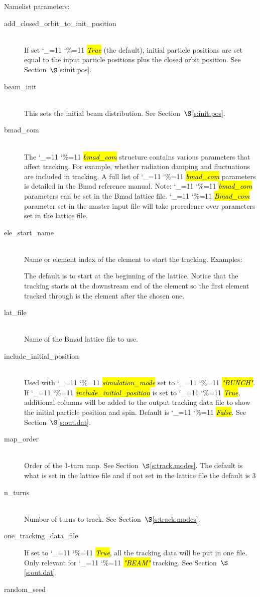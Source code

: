 \documentclass{hitec}
\newcommand\dottcmd[1]{\hl{\em#1}\endgroup}
\newcommand{\vn}{\begingroup\catcode`\_=11 \catcode`\%=11 \dottcmd}
\newcommand{\Newline}{\hfil \\}
\newcommand{\sref}[1]{$\S$\ref{#1}}
\begin{document}
{{Namelist parameters:
\begin{description}
\item[add_closed_orbit_to_init_position] \Newline
If set \vn{True} (the default), initial particle positions are set equal to the input particle positions
plus the closed orbit position. See Section~\sref{s:init.pos}.
%
\item[beam_init] \Newline
This sets the initial beam distribution. See Section~\sref{s:init.pos}.
%
\item[bmad_com] \Newline
The \vn{bmad_com} structure contains various parameters that affect tracking. For example, whether
radiation damping and fluctuations are included in tracking. A full list of \vn{bmad_com} parameters
is detailed in the Bmad reference manual. Note: \vn{bmad_com} parameters can be set in the Bmad
lattice file. \vn{Bmad_com} parameter set in the master input file will take precedence over
parameters set in the lattice file.
%
\item[ele_start_name] \Newline
Name or element index of the element to start the tracking. Examples:
The default is to start at the beginning of the lattice. Notice that the tracking starts at the downstream
end of the element so the first element tracked through is the element after the chosen one.
%
\item[lat_file] \Newline
Name of the Bmad lattice file to use.
%
\item[include_initial_position] \Newline
Used with \vn{simulation_mode} set to \vn{"BUNCH"}. If \vn{include_initial_position} is set to \vn{True},
additional columns will be added to the output tracking data file to show the initial particle
position and spin. Default is \vn{False}. See Section~\sref{s:out.dat}.
%
\item[map_order] \Newline
Order of the 1-turn map. See Section~\sref{s:track.modes}. The default is what is set in the lattice file
and if not set in the lattice file the default is 3
%
\item[n_turns] \Newline
Number of turns to track. See Section~\sref{s:track.modes}.
%
\item[one_tracking_data_file]
If set to \vn{True}, all the tracking data will be put in one file. Only relevant for \vn{"BEAM"} tracking.
See Section~\sref{s:out.dat}.
%
\item[random_seed] \Newline

\end{description}}}
\end{document}
